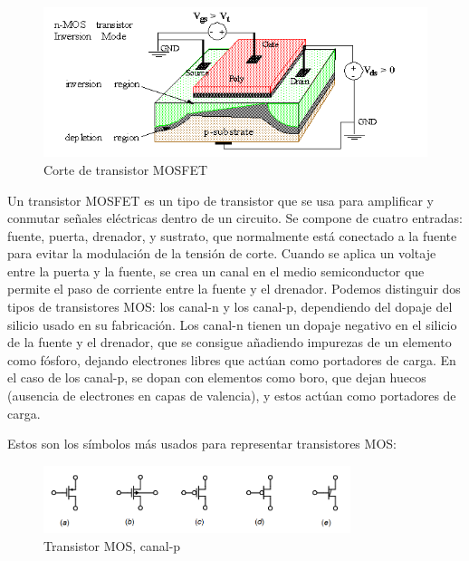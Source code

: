 \documentclass[12pt]{report} %
\begin{document}
	\begin{figure}[H]
		\includegraphics[width=\textwidth]{mos_transistor.png}
		\caption[Corte de transistor MOSFET]{Corte de transistor MOSFET\protect\footnotemark}
		\label{fig:mos_transistor.png}
	\end{figure}

	
	Un transistor MOSFET es un tipo de transistor que se usa para amplificar y conmutar señales eléctricas dentro de un circuito. Se compone de cuatro entradas: fuente, puerta, drenador, y sustrato, que normalmente está conectado a la fuente para evitar la modulación de la tensión de corte. Cuando se aplica un voltaje entre la puerta y la fuente, se crea un canal en el medio semiconductor que permite el paso de corriente entre la fuente y el drenador. Podemos distinguir dos tipos de transistores MOS: los canal-n y los canal-p, dependiendo del dopaje del silicio usado en su fabricación. Los canal-n tienen un dopaje negativo en el silicio de la fuente y el drenador, que se consigue añadiendo impurezas de un elemento como fósforo, dejando electrones libres que actúan como portadores de carga. En el caso de los canal-p, se dopan con elementos como boro, que dejan huecos (ausencia de electrones en capas de valencia), y estos actúan como portadores de carga.
	
	Estos son los símbolos más usados para representar transistores MOS:
	
	\begin{figure}[H]
		\includegraphics[width=0.8\textwidth]{p-mos-symbol.png}
		\caption[Transistor MOS, canal-p]{Transistor MOS, canal-p\protect\footnotemark}
		\label{fig:p-mos-symbol.png}
	\end{figure}
\end{document}

